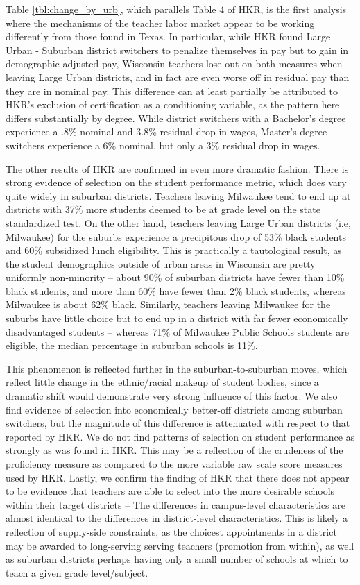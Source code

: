 \documentclass[12pt,]{article}
\begin{document}
Table \ref{tbl:change_by_urb}, which parallels Table 4 of HKR, is the
first analysis where the mechanisms of the teacher labor market appear
to be working differently from those found in Texas. In particular,
while HKR found Large Urban - Suburban district switchers to penalize
themselves in pay but to gain in demographic-adjusted pay, Wisconsin
teachers lose out on both measures when leaving Large Urban districts,
and in fact are even worse off in residual pay than they are in nominal
pay. This difference can at least partially be attributed to HKR's
exclusion of certification as a conditioning variable, as the pattern
here differs substantially by degree. While district switchers with a
Bachelor's degree experience a .8\% nominal and 3.8\% residual drop in
wages, Master's degree switchers experience a 6\% nominal, but only a
3\% residual drop in wages.

The other results of HKR are confirmed in even more dramatic fashion.
There is strong evidence of selection on the student performance metric,
which does vary quite widely in suburban districts. Teachers leaving
Milwaukee tend to end up at districts with 37\% more students deemed to
be at grade level on the state standardized test. On the other hand,
teachers leaving Large Urban districts (i.e, Milwaukee) for the suburbs
experience a precipitous drop of 53\% black students and 60\% subsidized
lunch eligibility. This is practically a tautological result, as the
student demographics outside of urban areas in Wisconsin are pretty
uniformly non-minority -- about 90\% of suburban districts have fewer
than 10\% black students, and more than 60\% have fewer than 2\% black
students, whereas Milwaukee is about 62\% black. Similarly, teachers
leaving Milwaukee for the suburbs have little choice but to end up in a
district with far fewer economically disadvantaged students -- whereas
71\% of Milwaukee Public Schools students are eligible, the median
percentage in suburban schools is 11\%.

This phenomenon is reflected further in the suburban-to-suburban moves,
which reflect little change in the ethnic/racial makeup of student
bodies, since a dramatic shift would demonstrate very strong influence
of this factor. We also find evidence of selection into economically
better-off districts among suburban switchers, but the magnitude of this
difference is attenuated with respect to that reported by HKR. We do not
find patterns of selection on student performance as strongly as was
found in HKR. This may be a reflection of the crudeness of the
proficiency measure as compared to the more variable raw scale score
measures used by HKR. Lastly, we confirm the finding of HKR that there
does not appear to be evidence that teachers are able to select into the
more desirable schools within their target districts -- The differences
in campus-level characteristics are almost identical to the differences
in district-level characteristics. This is likely a reflection of
supply-side constraints, as the choicest appointments in a district may
be awarded to long-serving serving teachers (promotion from within), as
well as suburban districts perhaps having only a small number of schools
at which to teach a given grade level/subject.
\end{document}
